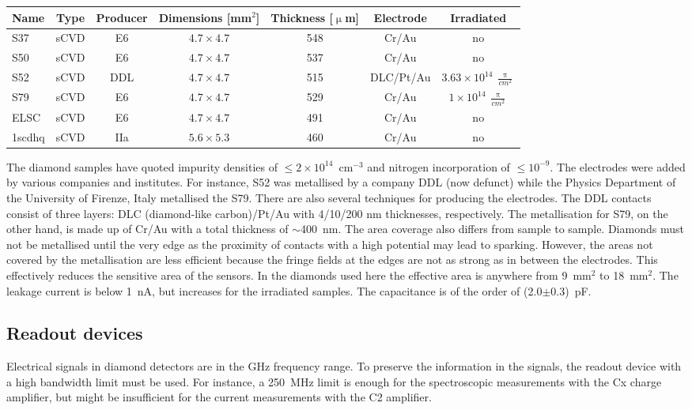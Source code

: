 \begin{footnotesize}
\begin{center}
\begin{tabular}{   l  c  c  c  c c c }
\hline
Name & Type &Producer & Dimensions [mm$^2$] & Thickness [$\upmu$m] & Electrode & Irradiated \\
\hline
S37 & sCVD & E6 & $4.7\times4.7$ & 548 & Cr/Au & no \\
S50 & sCVD & E6 & $4.7\times4.7$ & 537 & Cr/Au & no \\
S52 & sCVD & DDL & $4.7\times4.7$ & 515 & DLC/Pt/Au & $3.63\times10^{14}~\frac{\uppi}{cm^{2}}$ \\
S79 & sCVD & E6 & $4.7\times4.7$ & 529 & Cr/Au & $1\times10^{14}~\frac{\uppi}{cm^{2}}$ \\
ELSC & sCVD & E6 & $4.7\times4.7$ & 491 & Cr/Au & no \\
1scdhq & sCVD & IIa & $5.6\times5.3$ & 460 & Cr/Au & no \\
\hline
\end{tabular}
\label{tab:diamsamp}
\end{center}
\end{footnotesize}

The diamond samples have quoted impurity densities of $\leq2\times10^{14}$~cm$^{-3}$ and nitrogen incorporation of $\leq10^{-9}$. The electrodes were added by various companies and institutes. For instance, S52 was metallised by a company DDL (now defunct) while the Physics Department of the University of Firenze, Italy metallised the S79. There are also several techniques for producing the electrodes. The DDL contacts consist of three layers: DLC (diamond-like carbon)/Pt/Au with 4/10/200 nm thicknesses, respectively. The metallisation for S79, on the other hand, is made up of Cr/Au with a total thickness of $\sim$400~nm. The area coverage also differs from sample to sample. Diamonds must not be metallised until the very edge as the proximity of contacts with a high potential may lead to sparking. However, the areas not covered by the metallisation are less efficient because the fringe fields at the edges are not as strong as in between the electrodes. This effectively reduces the sensitive area of the sensors. In the diamonds used here the effective area is anywhere from 9~mm$^2$ to 18~mm$^2$. The leakage current is below 1~nA, but increases for the irradiated samples. The capacitance is of the order of (2.0$\pm$0.3)~pF.


\subsection{Readout devices}
\label{sec:readoutdev}
Electrical signals in diamond detectors are in the GHz frequency range. To preserve the information in the signals, the readout device with a high bandwidth limit must be used. For instance, a 250~MHz limit is enough for the spectroscopic measurements with the Cx charge amplifier, but might be insufficient for the current measurements with the C2 amplifier. 

